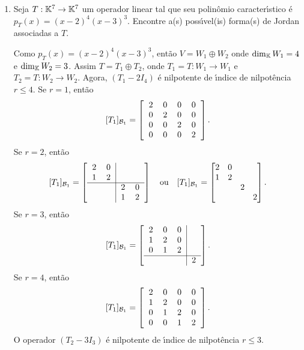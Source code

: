 \begin{exemplo}
	\begin{enumerate}[label={\arabic*})]
		\item Seja $T : \mathbb{K}^7 \to \mathbb{K}^7$ um operador linear tal que seu polin\^omio caracter{\'\i}stico \'e $p_T(x) = (x - 2)^4(x - 3)^3$. Encontre a(s) poss{\'\i}vel(is) forma(s) de Jordan associadas a $T$.
		\begin{solucao}
			Como $p_T(x) = (x - 2)^4(x - 3)^3$, ent\~ao $V = W_1 \oplus W_2$ onde $\dim_{\mathbb{K}}W_1 = 4$ e $\dim_{\mathbb{K}}W_2 = 3$. Assim $T = T_1 \oplus T_2$, onde $T_1 = T : W_1 \to W_1$ e $T_2 = T : W_2 \to W_2$. Agora, $(T_1 - 2I_4)$ \'e nilpotente de {\'\i}ndice de nilpot\^encia $r \le 4$.
			Se $r = 1$, ent\~ao
			\[
				[T_1]_{\mathcal{B}_1} = \left[\begin{tabular}{cccc}
 					2 & 0 & 0 & 0\\
 					0 & 2 & 0 & 0\\
 					0 & 0 & 2 & 0 \\
 					0 & 0 & 0 & 2
				\end{tabular}
				\right].
			\]
			Se $r = 2$, ent\~ao
			\[
				[T_1]_{\mathcal{B}_1} = \left[\begin{tabular}{cc|cc}
 					2 & 0 &  & \\
 					1 & 2 &  & \\ \cline{1-4}
 					&  & 2 & 0 \\
 					&  & 1 & 2
 				\end{tabular}
				\right]\quad \mbox{ou}\quad [T_1]_{\mathcal{B}_1} = \begin{bmatrix}
 					2 & 0 &  & \\
 					1 & 2 &  & \\
 					&  & 2 &  \\
 					&  &  & 2
 				\end{bmatrix}.
			\]
			Se $r = 3$, ent\~ao
			\[
				[T_1]_{\mathcal{B}_1} = \left[\begin{tabular}{ccc|c}
 						2 & 0 & 0 & \\
 						1 & 2 & 0 & \\
 						0 & 1 & 2 & \\ \cline{1-4}
 						&  &  & 2
					\end{tabular}
				\right].
			\]
			Se $r = 4$, ent\~ao
			\[
				[T_1]_{\mathcal{B}_1} = \left[\begin{tabular}{ccccc}
 						2 & 0 & 0 & 0\\
 						1 & 2 & 0 & 0\\
 						0 & 1 & 2 & 0\\
 						0 & 0 & 1 & 2
					\end{tabular}
				\right].
			\]
			O operador $(T_2 - 3I_3)$ \'e nilpotente de {\'\i}ndice de nilpot\^encia $r \le 3$.


\end{solucao}
\end{enumerate}
\end{exemplo}
